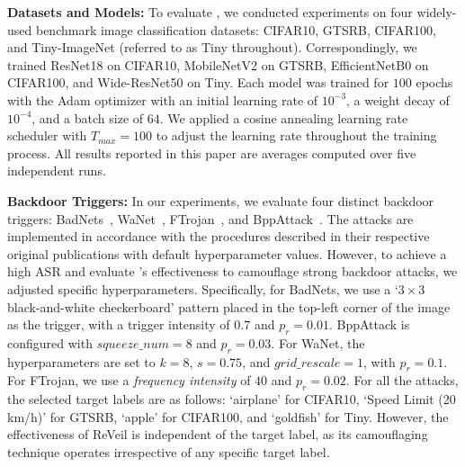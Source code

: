 \noindent \textbf{Datasets and Models:} To evaluate \methodname, we conducted experiments on four widely-used benchmark image classification datasets: CIFAR10, GTSRB, CIFAR100, and Tiny-ImageNet (referred to as Tiny throughout). Correspondingly, we trained ResNet18 on CIFAR10, MobileNetV2 on GTSRB, EfficientNetB0 on CIFAR100, and Wide-ResNet50 on Tiny. Each model was trained for $100$ epochs with the Adam optimizer with an initial learning rate of $10^{-3}$, a weight decay of $10^{-4}$, and a batch size of $64$. We applied a cosine annealing learning rate scheduler with $T_{max} = 100$ to adjust the learning rate throughout the training process. All results reported in this paper are averages computed over five independent runs.

\vspace{0.15cm}
\noindent \textbf{Backdoor Triggers:} In our experiments, we evaluate four distinct backdoor triggers: BadNets~\cite{badnets}, WaNet~\cite{wanet}, FTrojan~\cite{ftrojan}, and BppAttack~\cite{bppattack}. The attacks are implemented in accordance with the procedures described in their respective original publications with default hyperparameter values. However, to achieve a high ASR and evaluate \methodname's effectiveness to camouflage strong backdoor attacks, we adjusted specific hyperparameters. Specifically, for BadNets, we use a `$3\times3$ black-and-white checkerboard' pattern placed in the top-left corner of the image as the trigger, with a trigger intensity of $0.7$ and $p_r = 0.01$. BppAttack is configured with $squeeze\_num = 8$ and $p_r = 0.03$. For WaNet, the hyperparameters are set to $k=8$, $s=0.75$, and $grid\_rescale = 1$, with $p_r = 0.1$. For FTrojan, we use a \textit{frequency intensity} of $40$ and $p_r = 0.02$. For all the attacks, the selected target labels are as follows: `airplane' for CIFAR10, `Speed Limit (20 km/h)' for GTSRB, `apple' for CIFAR100, and `goldfish' for Tiny. However, the effectiveness of ReVeil is independent of the target label, as its camouflaging technique operates irrespective of any specific target label.

